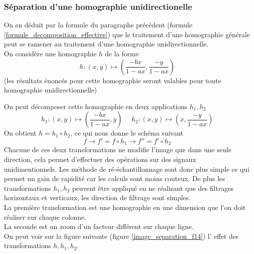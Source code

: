 \subsubsection{Séparation d'une homographie unidirectionelle}
\label{homobox_paragraph}
On en déduit par la formule du paragraphe précédent (formule \ref{formule_decomposition_effective}) que le traitement d'une homographie générale peut se ramener au traitement d'une homographie  unidirectionnelle.\\
On considère une homographie  $h$ de la forme 
\begin{equation*}
h:(x,y)\mapsto \left(\frac{-bx}{1-ax},\frac{-y}{1-ax}\right)
\end{equation*}
(les résultats énoncés pour cette homographie seront valables pour toute homographie unidirectionnelle)

On peut décomposer cette homographie en deux applications $h_1 , h_2$
\begin{equation*}
h_1:(x,y) \mapsto \left(\frac{-bx}{1-ax},y\right)~~~~~~h_2:(x,y) \mapsto \left(x,\frac{-y}{1-ax}\right)
\end{equation*}
On obtient $h=h_1  \circ h_2$, ce qui nous donne le schéma suivant 
\begin{equation*}
f\longrightarrow f'=f\circ h_1 \longrightarrow f''=f'\circ h_2
\end{equation*}
Chacune de ces deux transformations ne modifie l'image que dans une seule direction, cela permet d'effectuer des opérations sur des signaux unidimentionnels. Les méthode de ré-échantillonnage sont donc plus simple ce qui permet un gain de rapidité car les calculs sont moins couteux. De plus les transformations $h_1,h_2$ peuvent être appliqué en ne réalisant que des filtrages horizontaux et verticaux, les direction de filtrage sont simples.\\ 
La première transformation est une homographie en une dimension que l'on doit réaliser sur chaque colonne.\\ 
La seconde est un zoom d'un facteur différent sur chaque ligne.\\
On peut voir sur la figure suivante (figure  \ref{image_separation_f14}) l' effet des transformations $h,h_1,h_2$.\\

